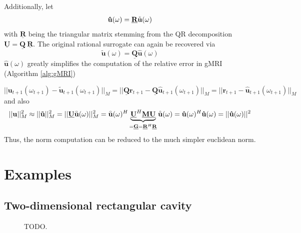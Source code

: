 \documentclass[11pt, a4paper]{article}
\begin{document}
Additionally, let
\begin{equation}
    \mathbf{\hat{u}}(\omega) = \mathbf{\underline{R}} \accentset{\circ}{\mathbf{u}}(\omega) \label{equ:u-hat}
\end{equation}
with $\mathbf{\underline{R}}$ being the triangular matrix stemming from the QR decomposition 
$\mathbf{\underline{U}} = \mathbf{\underline{Q}} ~ \mathbf{\underline{R}}$.
The original rational surrogate can again be recovered via
\begin{equation}
    \mathbf{\tilde{u}}(\omega) = \mathbf{\underline{Q}} \mathbf{\hat{u}}(\omega)
\end{equation}
$\mathbf{\hat{u}}(\omega)$ greatly simplifies the computation of the relative 
error in \acrshort{gMRI} (Algorithm \ref{alg:gMRI})

\begin{equation}
    ||\mathbf{u}_{t+1}(\omega_{t+1}) - \mathbf{\tilde{u}}_{t+1}(\omega_{t+1})||_M
    = ||\mathbf{\underline{Q}} \mathbf{r}_{t+1} - \mathbf{\underline{Q}}\mathbf{\hat{u}}_{t+1}(\omega_{t+1})||_M
    = ||\mathbf{r}_{t+1} - \mathbf{\hat{u}}_{t+1}(\omega_{t+1})||_M
\end{equation}
and also
\begin{equation}
    ||\mathbf{u}||_M^2 \approx ||\mathbf{\tilde{u}}||_M^2
    = ||\mathbf{\underline{U}} \accentset{\circ}{\mathbf{u}}(\omega)||_M^2
    = \accentset{\circ}{\mathbf{u}}(\omega)^H \underbrace{\mathbf{\underline{U}}^H \mathbf{\underline{M}} \mathbf{\underline{U}}}_{= \mathbf{\underline{G}} = \mathbf{\underline{R}}^H \mathbf{\underline{R}}} \accentset{\circ}{\mathbf{u}}(\omega)
    = \mathbf{\hat{u}}(\omega)^H \mathbf{\hat{u}}(\omega)
    = ||\mathbf{\hat{u}}(\omega)||^2
\end{equation}
Thus, the norm computation can be reduced to the much simpler euclidean norm.

\newpage
\section{Examples}
\label{sec:examples}

\subsection{Two-dimensional rectangular cavity}
\label{subsec:examples-rectangularcavity}

\begin{figure}[h]
    \centering
    
    \caption{TODO.}
    \label{fig:rectangular_cavity}
\end{figure}
\end{document}
